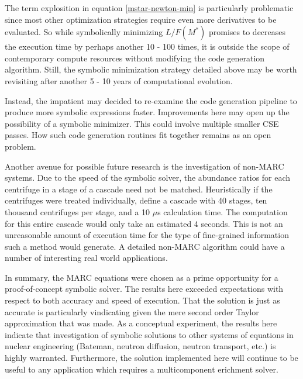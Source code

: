 \documentclass[preprint,12pt]{elsarticle}
\newcommand{\us}[0]{$\mu$s }
\begin{document}
The term explosition in equation \ref{mstar-newton-min} is particularly problematic 
since most other optimization strategies require
even more derivatives to be evaluated.  So while symbolically minimizing $L/F(M^*)$
 promises
to decreases the execution time by perhaps another 10 - 100 times, it is 
outside the scope of contemporary compute resources without modifying the 
code generation algorithm.  Still, the symbolic minimization strategy detailed above
may be worth revisiting after another 5 - 10 years of computational evolution.

Instead, the impatient may decided to re-examine the code generation pipeline to 
produce more symbolic expressions faster.  Improvements here may open up the 
possibility of
a symbolic minimizer.  This could involve multiple smaller CSE passes.  How 
such code generation routines fit together remains as an open problem.

Another avenue for possible future research is the investigation of non-MARC 
systems.  Due to the speed of the symbolic solver, the abundance ratios for 
each centrifuge in a stage of a cascade need not be matched.  Heuristically
if the centrifuges were treated individually, define a cascade with 40 stages, 
ten thousand centrifuges per stage, and a 10 \us calculation time. 
The computation for this entire
cascade would only take an estimated 4 seconds.  This is not an unreasonable 
amount of execution time for the type of fine-grained information such a 
method would generate.  A detailed non-MARC algorithm could have a number of
interesting real world applications.

In summary, the MARC equations were chosen as a prime opportunity for a 
proof-of-concept symbolic solver.  The results here exceeded expectations with 
respect to
both accuracy and speed of execution.  That the solution is just as accurate 
is particularly vindicating given the mere second order Taylor approximation that 
was made.  As a conceptual experiment, the results here indicate that
investigation of symbolic solutions to other systems of equations in 
nuclear engineering (Bateman, neutron diffusion, neutron transport, etc.) is
highly warranted.  Furthermore, the solution implemented here will continue to be 
useful to any application which requires a multicomponent erichment solver.


\end{document}
